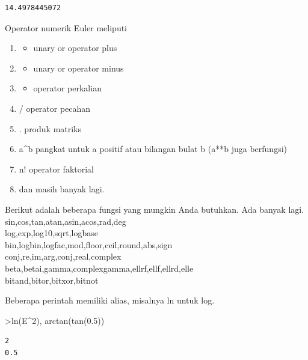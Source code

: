 \documentclass[
]{book}
\providecommand{\tightlist}{%
  \setlength{\itemsep}{0pt}\setlength{\parskip}{0pt}}
\begin{document}
\begin{verbatim}
14.4978445072
\end{verbatim}

Operator numerik Euler meliputi

\begin{enumerate}
\def\labelenumi{\arabic{enumi}.}
\tightlist
\item
  \begin{itemize}
  \tightlist
  \item
    unary or operator plus\\
  \end{itemize}
\item
  \begin{itemize}
  \tightlist
  \item
    unary or operator minus
  \end{itemize}
\item
  \begin{itemize}
  \tightlist
  \item
    operator perkalian\\
  \end{itemize}
\item
  / operator pecahan\\
\item
  . produk matriks\\
\item
  a\^{}b pangkat untuk a positif atau bilangan bulat b (a**b juga berfungsi)
\item
  n! operator faktorial
\item
  dan masih banyak lagi.
\end{enumerate}

Berikut adalah beberapa fungsi yang mungkin Anda butuhkan. Ada banyak lagi. sin,cos,tan,atan,asin,acos,rad,deg\\
log,exp,log10,sqrt,logbase\\
bin,logbin,logfac,mod,floor,ceil,round,abs,sign\\
conj,re,im,arg,conj,real,complex\\
beta,betai,gamma,complexgamma,ellrf,ellf,ellrd,elle\\
bitand,bitor,bitxor,bitnot

Beberapa perintah memiliki alias, misalnya ln untuk log.

\textgreater ln(E\^{}2), arctan(tan(0.5))

\begin{verbatim}
2
0.5
\end{verbatim}
\end{document}

